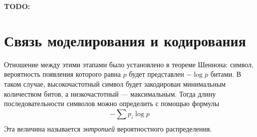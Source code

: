 \textbf{TODO:}

\section{Связь моделирования и кодирования}

Отношение между этими этапами было установлено в теореме Шеннона: символ, вероятность появления которого равна $p$ будет представлен \begin{math}-\log{p}\end{math} битами.
В таком случае, высокочастотный символ будет закодирован минимальным количеством битов, а низкочастотный --- максимальным. Тогда длину последовательности символов можно определить с помощью формулы
\begin{equation}\label{entropy}
   -\displaystyle\sum_{}^{}p_{i}\log{p}
\end{equation}
Эта величина называется \textit{энтропией} вероятностного распределения.
